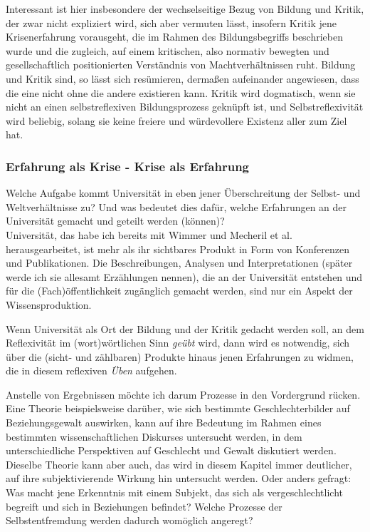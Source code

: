 Interessant ist hier insbesondere der wechselseitige Bezug von Bildung und
Kritik, der zwar nicht expliziert wird, sich aber vermuten lässt, insofern
Kritik jene Krisenerfahrung vorausgeht, die im Rahmen des Bildungsbegriffs
beschrieben wurde und die zugleich, auf einem kritischen, also normativ
bewegten und gesellschaftlich positionierten Verständnis von Machtverhältnissen
ruht. Bildung und Kritik sind, so lässt sich resümieren, dermaßen aufeinander
angewiesen, dass die  eine nicht ohne die andere existieren kann. Kritik wird
dogmatisch, wenn sie nicht an einen selbstreflexiven Bildungsprozess geknüpft
ist, und Selbstreflexivität wird beliebig, solang sie keine freiere und
würdevollere Existenz aller zum Ziel hat. 

\subsubsection{Erfahrung als Krise - Krise als Erfahrung}

Welche Aufgabe kommt Universität in eben jener Überschreitung der Selbst- und
Weltverhältnisse zu? Und was bedeutet dies dafür, welche Erfahrungen an der
Universität gemacht und geteilt werden (können)? \\
Universität, das habe ich
bereits mit Wimmer und Mecheril et al. herausgearbeitet, ist mehr als ihr
sichtbares Produkt in Form von Konferenzen und Publikationen. Die
Beschreibungen, Analysen und Interpretationen (später werde ich sie allesamt
Erzählungen nennen), die an der Universität entstehen und für die
(Fach)öffentlichkeit zugänglich gemacht werden, sind nur ein Aspekt der
Wissensproduktion. 

Wenn Universität als Ort der Bildung und der Kritik gedacht
werden soll, an dem Reflexivität im (wort)wörtlichen Sinn \textit{geübt} wird, dann wird
es notwendig, sich über die (sicht- und zählbaren) Produkte hinaus jenen
Erfahrungen zu widmen, die in diesem reflexiven \textit{Üben} aufgehen.  

Anstelle von
Ergebnissen möchte ich darum Prozesse in den Vordergrund rücken.\\  

Eine Theorie
beispielsweise darüber, wie sich bestimmte Geschlechterbilder auf
Beziehungsgewalt auswirken, kann auf ihre Bedeutung im Rahmen eines bestimmten
wissenschaftlichen Diskurses untersucht werden, in dem unterschiedliche
Perspektiven auf Geschlecht und Gewalt diskutiert werden. Dieselbe Theorie kann
aber auch, das wird in diesem Kapitel immer deutlicher, auf ihre
subjektivierende Wirkung hin untersucht werden. Oder anders gefragt:\\
Was macht
jene Erkenntnis mit einem Subjekt, das sich als vergeschlechtlicht begreift und
sich in Beziehungen befindet? Welche Prozesse der Selbstentfremdung werden
dadurch womöglich angeregt?  

